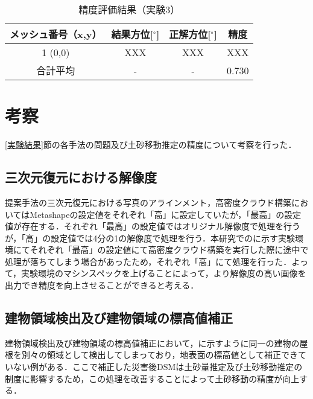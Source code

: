     \begin{table}[b]
      \centering
      \caption{精度評価結果（実験3）}
      \label{精度評価結果（実験3）}
      \begin{tabular}{cccc}
        \hline
        \textbf{メッシュ番号（x,y）} & \textbf{結果方位[$^{\circ}$]} & \textbf{正解方位[$^{\circ}$]} & \textbf{精度} \\
        \hline  \hline
        1  (0,0)  & XXX & XXX & XXX \\
        合計平均 & - & - & 0.730 \\
        \hline
      \end{tabular}
    \end{table}



  \section{考察}
    \label{考察}
    \ref{実験結果}節の各手法の問題及び土砂移動推定の精度について考察を行った．


    \subsection*{三次元復元における解像度}
      提案手法の三次元復元における写真のアラインメント，高密度クラウド構築においてはMetashapeの設定値をそれぞれ「高」に設定していたが，「最高」の設定値が存在する．それぞれ「最高」の設定値ではオリジナル解像度で処理を行うが，「高」の設定値では4分の1の解像度で処理を行う．本研究でのに示す実験環境にてそれぞれ「最高」の設定値にて高密度クラウド構築を実行した際に途中で処理が落ちてしまう場合があったため，それぞれ「高」にて処理を行った．よって，実験環境のマシンスペックを上げることによって，より解像度の高い画像を出力でき精度を向上させることができると考える．


    \subsection*{建物領域検出及び建物領域の標高値補正}
      建物領域検出及び建物領域の標高値補正において，に示すように同一の建物の屋根を別々の領域として検出してしまっており，地表面の標高値として補正できていない例がある．ここで補正した災害後DSMは土砂量推定及び土砂移動推定の制度に影響するため，この処理を改善することによって土砂移動の精度が向上する．
      

